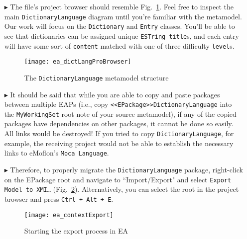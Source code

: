 \begin{itemize}
\item[$\blacktriangleright$] The file's project browser should resemble Fig.~\ref{ea:dictionaryLangStart}. Feel free to inspect the main
\texttt{DictionaryLanguage} diagram until you're familiar with the metamodel. Our work will focus on the \texttt{Dictionary} and \texttt{Entry} classes. You'll
be able to see that dictionaries can be assigned unique \texttt{ESTring title}s, and each entry will have some sort of \texttt{content} matched with one of
three difficulty \texttt{level}s.

\vspace{0.5cm}

\begin{figure}[htbp]
\begin{center}
  \texttt{[image: ea\_dictLangProBrowser]}
  \caption{The \texttt{DictionaryLanguage} metamodel structure}
  \label{ea:dictionaryLangStart}
\end{center}
\end{figure}

\item[$\blacktriangleright$] It should be said that while you are able to copy and paste packages between multiple EAPs (i.e., copy
\texttt{<<EPack\-age>>DictionaryLanguage} into the \texttt{MyWorkingSet} root note of your source metamodel), if any of the copied packages have dependencies on
other packages, it cannot be done so easily. All links would be destroyed! If you tried to copy \texttt{DictionaryLanguage}, for example, the receiving project
would not be able to establish the necessary links to eMoflon's \texttt{Moca Language}.

\clearpage

\item[$\blacktriangleright$] Therefore, to properly migrate the \texttt{DictionaryLanguage} package, right-click on the EPackage root and navigate to
``Import/Export" and select \texttt{Export Model to XMI\ldots} (Fig.~\ref{ea:contextExport}). Alternatively, you can select the root in the project browser and
press \texttt{Ctrl + Alt + E}.

\vspace{0.5cm}

\begin{figure}[htbp]
\begin{center}
  \texttt{[image: ea\_contextExport]}
  \caption{Starting the export process in EA}
  \label{ea:contextExport}
\end{center}
\end{figure}


\end{itemize}
